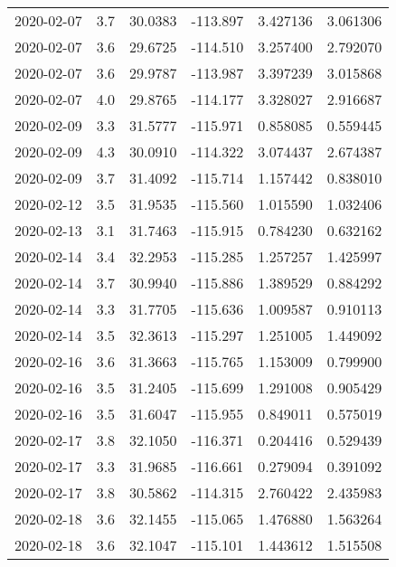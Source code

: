 \begin{tabular}{lrrrrr}
2020-02-07 &       3.7 &  30.0383 &  -113.897 &         3.427136 &         3.061306 \\
2020-02-07 &       3.6 &  29.6725 &  -114.510 &         3.257400 &         2.792070 \\
2020-02-07 &       3.6 &  29.9787 &  -113.987 &         3.397239 &         3.015868 \\
2020-02-07 &       4.0 &  29.8765 &  -114.177 &         3.328027 &         2.916687 \\
2020-02-09 &       3.3 &  31.5777 &  -115.971 &         0.858085 &         0.559445 \\
2020-02-09 &       4.3 &  30.0910 &  -114.322 &         3.074437 &         2.674387 \\
2020-02-09 &       3.7 &  31.4092 &  -115.714 &         1.157442 &         0.838010 \\
2020-02-12 &       3.5 &  31.9535 &  -115.560 &         1.015590 &         1.032406 \\
2020-02-13 &       3.1 &  31.7463 &  -115.915 &         0.784230 &         0.632162 \\
2020-02-14 &       3.4 &  32.2953 &  -115.285 &         1.257257 &         1.425997 \\
2020-02-14 &       3.7 &  30.9940 &  -115.886 &         1.389529 &         0.884292 \\
2020-02-14 &       3.3 &  31.7705 &  -115.636 &         1.009587 &         0.910113 \\
2020-02-14 &       3.5 &  32.3613 &  -115.297 &         1.251005 &         1.449092 \\
2020-02-16 &       3.6 &  31.3663 &  -115.765 &         1.153009 &         0.799900 \\
2020-02-16 &       3.5 &  31.2405 &  -115.699 &         1.291008 &         0.905429 \\
2020-02-16 &       3.5 &  31.6047 &  -115.955 &         0.849011 &         0.575019 \\
2020-02-17 &       3.8 &  32.1050 &  -116.371 &         0.204416 &         0.529439 \\
2020-02-17 &       3.3 &  31.9685 &  -116.661 &         0.279094 &         0.391092 \\
2020-02-17 &       3.8 &  30.5862 &  -114.315 &         2.760422 &         2.435983 \\
2020-02-18 &       3.6 &  32.1455 &  -115.065 &         1.476880 &         1.563264 \\
2020-02-18 &       3.6 &  32.1047 &  -115.101 &         1.443612 &         1.515508 \\

\end{tabular}
